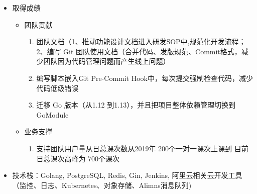 \documentclass{resume}
\begin{document}
\begin{itemize}
  \item 取得成绩
  \begin{itemize}
    \item 团队贡献
    \begin{enumerate}
      \item 团队文档（1、推动功能设计文档进入研发SOP中,规范化开发流程； 2、编写 Git 团队使用文档（合并代码、发版规范、Commit格式，减少团队因为代码管理问题而产生线上问题）
      \item 编写脚本嵌入Git Pre-Commit Hook中，每次提交强制检查代码，减少代码低级错误
      \item 迁移 Go 版本（从1.12 到1.13），并且把项目整体依赖管理切换到 GoModule
    \end{enumerate}
    \item 业务支撑
    \begin{enumerate}
      \item 支持团队用户量从日总课次数从2019年 200个一对一课次上课到 目前日总课次高峰为 700个课次 
    \end{enumerate}
  \end{itemize}
  \item 技术栈：Golang, PostgreSQL, Redis, Gin, Jenkins, 阿里云相关云开发工具（监控、日志、Kubernetes、对象存储、Alimns消息队列)
\end{itemize}
\end{document}

